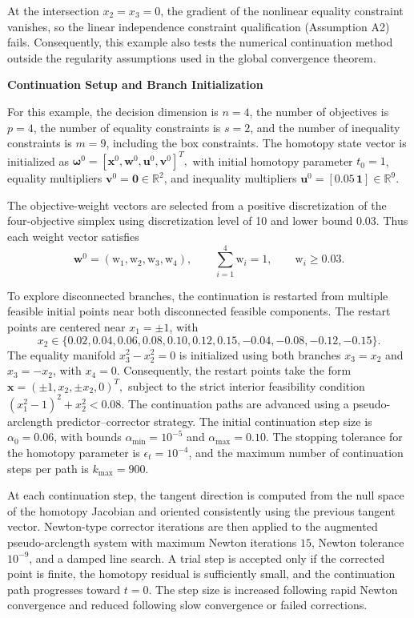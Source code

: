 \documentclass[11pt,pdflatex,sn-mathphys-ay]{sn-jnl}%
\theoremstyle{definition}
\theoremstyle{thmstyleone}%
\theoremstyle{thmstyletwo}%
\theoremstyle{thmstylethree}%
\newcommand{\bb}[1]{\mathbf{#1}}
\newcommand{\add}[1]{\textcolor{revisionblue}{#1}}
\begin{document}
	\add{At the intersection $x_2=x_3=0$, the
		gradient of the nonlinear equality constraint
		vanishes, so the linear independence constraint
		qualification (Assumption A2) fails. Consequently, this example
		also tests the numerical continuation method
		outside the regularity assumptions used in the
		global convergence theorem.}
	
	\medskip \noindent \textbf{Continuation Setup and Branch Initialization}
	
	For this example, the decision dimension is \(n=4\), the number of objectives is \(p=4\), the number of equality constraints is \(s=2\), and the number of inequality constraints is \(m=9\), including the box constraints. The homotopy state vector is initialized as $\bm{\omega}^0=[\bm{x}^0,\bb{w}^0,\bm{u}^0,\bm{v}^0]^T,$
	with initial homotopy parameter \(t_0=1\), equality multipliers \(\bm{v}^0=\mathbf{0}\in\mathbb{R}^2\), and inequality multipliers \(\bm{u}^0=[0.05\,\mathbf{1}]\in\mathbb{R}^9\).
	
	The objective-weight vectors are selected from a positive discretization of the four-objective simplex using discretization level of 10 and lower bound \(0.03\). Thus each weight vector satisfies
	\[
	\textbf{w}^0=(\text{w}_1,\text{w}_2,\text{w}_3,\text{w}_4),\qquad
	\sum_{i=1}^4 \text{w}_i=1,\qquad
	\text{w}_i\ge0.03.
	\]
	
	To explore disconnected branches, the continuation is restarted from multiple feasible initial points near both disconnected feasible components. The restart points are centered near \(x_1=\pm1\), with
	\[
	x_2\in\{0.02,0.04,0.06,0.08,0.10,0.12,0.15,-0.04,-0.08,-0.12,-0.15\}.
	\]
	The equality manifold \(x_3^2-x_2^2=0\) is initialized using both branches \(x_3=x_2\) and \(x_3=-x_2\), with \(x_4=0\). Consequently, the restart points take the form
	$\bm{x}=(\pm1,x_2,\pm x_2,0)^T,$
	subject to the strict interior feasibility condition
	$(x_1^2-1)^2+x_2^2<0.08.$
	The continuation paths are advanced using a pseudo-arclength predictor--corrector strategy. The initial continuation step size is \(\alpha_0=0.06\), with bounds \(\alpha_{\min}=10^{-5}\) and \(\alpha_{\max}=0.10\). The stopping tolerance for the homotopy parameter is \(\epsilon_t=10^{-4}\), and the maximum number of continuation steps per path is \(k_{\max}=900\).
	
	At each continuation step, the tangent direction is computed from the null space of the homotopy Jacobian and oriented consistently using the previous tangent vector. Newton-type corrector iterations are then applied to the augmented pseudo-arclength system with maximum Newton iterations \(15\), Newton tolerance \(10^{-9}\), and a damped line search. A trial step is accepted only if the corrected point is finite, the homotopy residual is sufficiently small, and the continuation path progresses toward \(t=0\). The step size is increased following rapid Newton convergence and reduced following slow convergence or failed corrections.
	
\end{document}
